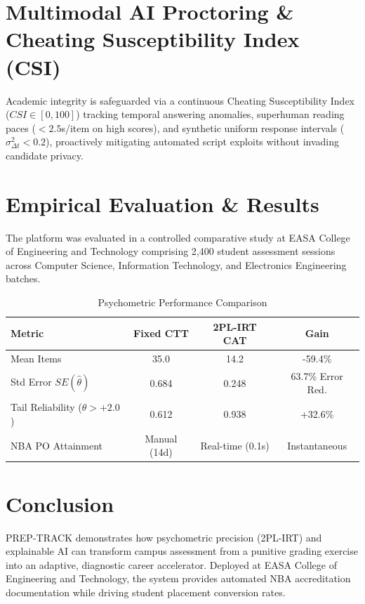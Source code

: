 \documentclass[conference]{IEEEtran}
\begin{document}
\section{Multimodal AI Proctoring \& Cheating Susceptibility Index (CSI)}
Academic integrity is safeguarded via a continuous Cheating Susceptibility Index ($CSI \in [0, 100]$) tracking temporal answering anomalies, superhuman reading paces ($< 2.5$s/item on high scores), and synthetic uniform response intervals ($\sigma^2_{\Delta t} < 0.2$), proactively mitigating automated script exploits without invading candidate privacy.

\section{Empirical Evaluation \& Results}
The platform was evaluated in a controlled comparative study at EASA College of Engineering and Technology comprising 2,400 student assessment sessions across Computer Science, Information Technology, and Electronics Engineering batches.
\begin{table}[htbp]
\caption{Psychometric Performance Comparison}
\begin{center}
\begin{tabular}{|l|c|c|c|}
\hline
\textbf{Metric} & \textbf{Fixed CTT} & \textbf{2PL-IRT CAT} & \textbf{Gain} \\
\hline
Mean Items & 35.0 & 14.2 & -59.4\% \\
Std Error $SE(\hat{\theta})$ & 0.684 & 0.248 & 63.7\% Error Red. \\
Tail Reliability ($\theta > +2.0$) & 0.612 & 0.938 & +32.6\% \\
NBA PO Attainment & Manual (14d) & Real-time (0.1s) & Instantaneous \\
\hline
\end{tabular}
\end{center}
\end{table}

\section{Conclusion}
PREP-TRACK demonstrates how psychometric precision (2PL-IRT) and explainable AI can transform campus assessment from a punitive grading exercise into an adaptive, diagnostic career accelerator. Deployed at EASA College of Engineering and Technology, the system provides automated NBA accreditation documentation while driving student placement conversion rates.
\end{document}
